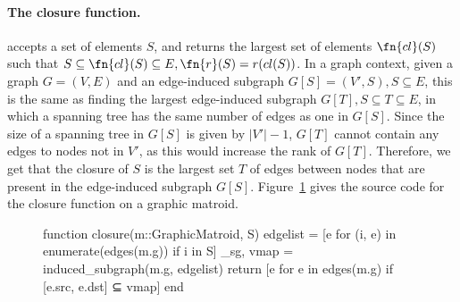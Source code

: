 \paragraph{The closure function.} accepts a set of elements $S$, and returns the largest set of elements $\fn{cl}(S)$ such that $S \subseteq \fn{cl}(S) \subseteq E, \fn{r}(S) = r(cl(S))$. In a graph context, given a graph $G=(V,E)$ and an edge-induced subgraph $G[S] = (V', S), S\subseteq E$, this is the same as finding the largest edge-induced subgraph $G[T], S\subseteq T\subseteq E$, in which a spanning tree has the same number of edges as one in $G[S]$. Since the size of a spanning tree in $G[S]$ is given by $|V'|-1$, $G[T]$ cannot contain any edges to nodes not in $V'$, as this would increase the rank of $G[T]$. Therefore, we get that the closure of $S$ is the largest set $T$ of edges between nodes that are present in the edge-induced subgraph $G[S]$. Figure~\ref{code:closure_graphic} gives the source code for the closure function on a graphic matroid.
\begin{figure}[ht!]
\begin{jllisting}
function closure(m::GraphicMatroid, S)
  edgelist = [e for (i, e) in enumerate(edges(m.g)) if i in S]
  _sg, vmap = induced_subgraph(m.g, edgelist)
  return [e for e in edges(m.g) if [e.src, e.dst] ⊆ vmap]
end
\end{jllisting}
\caption{}
\label{code:closure_graphic}
\end{figure}



